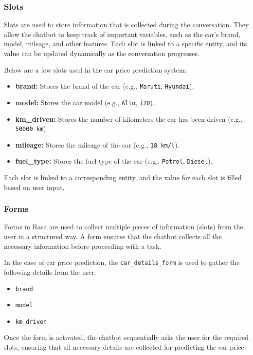 \documentclass[a4paper,12pt]{article}
\begin{document}
\subsubsection{Slots}
Slots are used to store information that is collected during the conversation. They allow the chatbot to keep track of important variables, such as the car's brand, model, mileage, and other features. Each slot is linked to a specific entity, and its value can be updated dynamically as the conversation progresses.

Below are a few slots used in the car price prediction system:

\begin{itemize}
	\item \textbf{brand:} Stores the brand of the car (e.g., \texttt{Maruti}, \texttt{Hyundai}).
	\item \textbf{model:} Stores the car model (e.g., \texttt{Alto}, \texttt{i20}).
	\item \textbf{km\_driven:} Stores the number of kilometers the car has been driven (e.g., \texttt{50000 km}).
	\item \textbf{mileage:} Stores the mileage of the car (e.g., \texttt{18 km/l}).
	\item \textbf{fuel\_type:} Stores the fuel type of the car (e.g., \texttt{Petrol}, \texttt{Diesel}).
\end{itemize}

Each slot is linked to a corresponding entity, and the value for each slot is filled based on user input.

\subsubsection{Forms}
Forms in Rasa are used to collect multiple pieces of information (slots) from the user in a structured way. A form ensures that the chatbot collects all the necessary information before proceeding with a task.

In the case of car price prediction, the \texttt{car\_details\_form} is used to gather the following details from the user:

\begin{itemize}
	\item \texttt{brand}
	\item \texttt{model}
	\item \texttt{km\_driven}
\end{itemize}

Once the form is activated, the chatbot sequentially asks the user for the required slots, ensuring that all necessary details are collected for predicting the car price.
\end{document}
